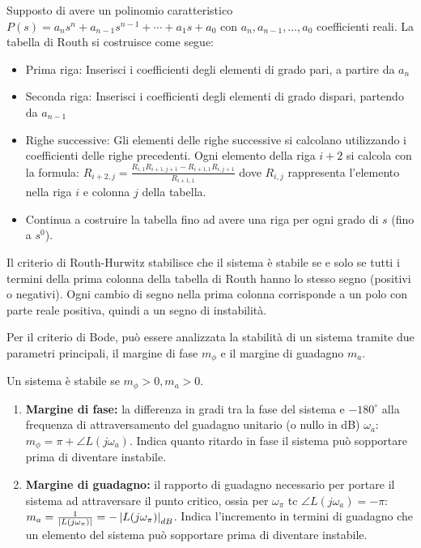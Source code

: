 Supposto di avere un polinomio caratteristico \(P(s)=a_n s^n+a_{n-1}s^{n-1}+⋯+a_1 s+a_0\) con \(a_n,a_{n-1},…,a_0\) coefficienti reali. La tabella di Routh si costruisce come segue:

\begin{itemize}
    \item Prima riga: Inserisci i coefficienti degli elementi di grado pari, a partire da \(a_n\)
    \item Seconda riga: Inserisci i coefficienti degli elementi di grado dispari, partendo da \(a_{n-1}\)
    \item Righe successive: Gli elementi delle righe successive si calcolano utilizzando i coefficienti delle righe precedenti. Ogni elemento della riga \(i+2\) si calcola con la formula: \(R_{i+2,j} =\frac{ R_{i,1} R_{i+1,j+1} - R_{i+1,1} R_{i,j+1}}{R_{i+1,1}}\)
    dove \(R_{i,j}\) rappresenta l'elemento nella riga \(i\) e colonna \(j\) della tabella.
    \item Continua a costruire la tabella fino ad avere una riga per ogni grado di \(s\) (fino a \(s^0\)).
\end{itemize}


Il criterio di Routh-Hurwitz stabilisce che il sistema è stabile se e solo se tutti i termini della prima colonna della tabella di Routh hanno lo stesso segno (positivi o negativi).
Ogni cambio di segno nella prima colonna corrisponde a un polo con parte reale positiva, quindi a un segno di instabilità.

\label{CriterioBode}
Per il criterio di Bode, può essere analizzata la stabilità di un sistema tramite due parametri principali, il margine di fase \(m_\phi\) e il margine di guadagno \(m_a\). 

\begin{center}
Un sistema è stabile se \(m_\phi>0,m_a>0\).
\end{center}

\begin{enumerate}
    \item \textbf{Margine di fase:} la differenza in gradi tra la fase del sistema e \(-180^\circ\) alla frequenza di attraversamento del guadagno unitario (o nullo in dB) \(\omega_a\): \(m_\phi=\pi + \angle{L(j\omega_a)}\). Indica quanto ritardo in fase il sistema può sopportare prima di diventare instabile. 
    \item \textbf{Margine di guadagno:} il rapporto di guadagno necessario per portare il sistema ad attraversare il punto critico, ossia per \(\omega_\pi\) tc \(\angle{L(j\omega_a)}=-\pi\): \(m_a=\frac{1}{\left|L(j\omega_\pi)\right|}=-\left|L(j\omega_\pi)\right|_{dB}\). Indica l'incremento in termini di guadagno che un elemento del sistema può sopportare prima di diventare instabile. 
\end{enumerate}

